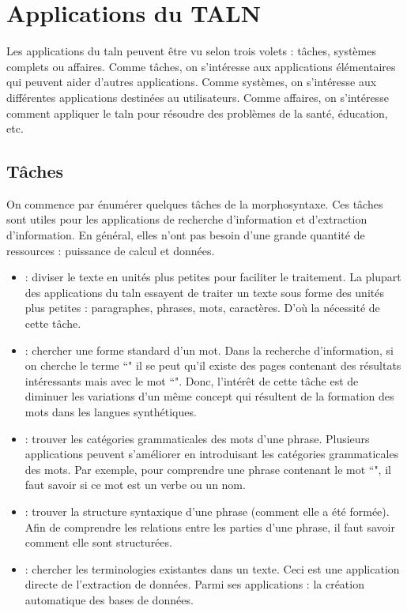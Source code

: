 \documentclass{KodeBook}
\begin{document}
\section{Applications du TALN}

Les applications du \ac{taln} peuvent être vu selon trois volets : tâches, systèmes complets ou affaires. 
Comme tâches, on s'intéresse aux applications élémentaires qui peuvent aider d'autres applications. 
Comme systèmes, on s'intéresse aux différentes applications destinées au utilisateurs. 
Comme affaires, on s'intéresse comment appliquer le \ac{taln} pour résoudre des problèmes de la santé, éducation, etc.

\subsection{Tâches}

On commence par énumérer quelques tâches de la morphosyntaxe. 
Ces tâches sont utiles pour les applications de recherche d'information et d'extraction d'information. 
En général, elles n'ont pas besoin d'une grande quantité de ressources : puissance de calcul et données.
\begin{itemize}
	\item {} : diviser le texte en unités plus petites pour faciliter le traitement. 
	La plupart des applications du \ac{taln} essayent de traiter un texte sous forme des unités plus petites : paragraphes, phrases, mots, caractères.
	D'où la nécessité de cette tâche.
	\item {} : chercher une forme standard d'un mot. 
	Dans la recherche d'information, si on cherche le terme ``" il se peut qu'il existe des pages contenant des résultats intéressants mais avec le mot ``". 
	Donc, l'intérêt de cette tâche est de diminuer les variations d'un même concept qui résultent de la formation des mots dans les langues synthétiques.
	\item {} : trouver les catégories grammaticales des mots d'une phrase. 
	Plusieurs applications peuvent s'améliorer en introduisant les catégories grammaticales des mots. 
	Par exemple, pour comprendre une phrase contenant le mot ``", il faut savoir si ce mot est un verbe ou un nom.
	\item {} : trouver la structure syntaxique d'une phrase (comment elle a été formée).
	Afin de comprendre les relations entre les parties d'une phrase, il faut savoir comment elle sont structurées.
	\item {} : chercher les terminologies existantes dans un texte. 
	Ceci est une application directe de l'extraction de données. 
	Parmi ses applications : la création automatique des bases de données.
\end{itemize}
\end{document}
